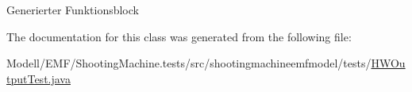 Generierter Funktionsblock 

The documentation for this class was generated from the following file\-:\begin{DoxyCompactItemize}
\item 
Modell/\-E\-M\-F/\-Shooting\-Machine.\-tests/src/shootingmachineemfmodel/tests/\hyperlink{_h_w_output_test_8java}{H\-W\-Output\-Test.\-java}\end{DoxyCompactItemize}
